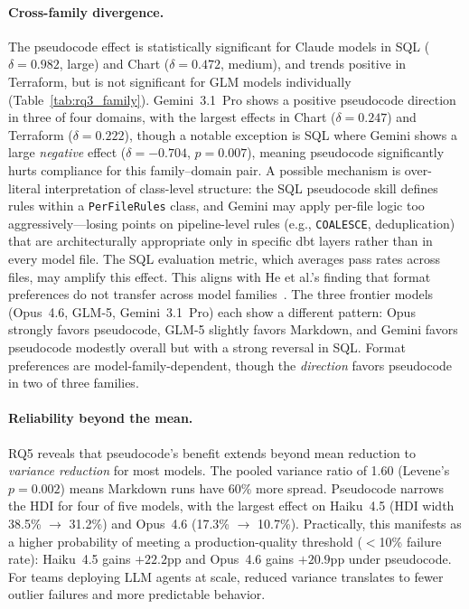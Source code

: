 \documentclass[sigconf,nonacm]{acmart}
\begin{document}
\paragraph{Cross-family divergence.}
The pseudocode effect is statistically significant for Claude models in SQL
($\delta = 0.982$, large) and Chart ($\delta = 0.472$, medium), and trends
positive in Terraform, but is
not significant for GLM models individually (Table~\ref{tab:rq3_family}).
Gemini~3.1~Pro shows a positive pseudocode direction in three of four domains,
with the largest effects in Chart ($\delta = 0.247$) and
Terraform ($\delta = 0.222$), though a notable exception is SQL where
Gemini shows a large \emph{negative} effect ($\delta = -0.704$, $p = 0.007$),
meaning pseudocode significantly hurts compliance for this family--domain pair.
A possible mechanism is over-literal interpretation of class-level structure:
the SQL pseudocode skill defines rules within a \texttt{PerFileRules} class,
and Gemini may apply per-file logic too aggressively---losing points on
pipeline-level rules (e.g., \texttt{COALESCE}, deduplication) that are
architecturally appropriate only in specific dbt layers rather than in every
model file. The SQL evaluation metric, which averages pass rates across files,
may amplify this effect.
This aligns with He et al.'s finding that format
preferences do not transfer across model families~\cite{he2024prompt}.
The three frontier models (Opus~4.6, GLM-5, Gemini~3.1~Pro) each show a
different pattern: Opus strongly favors pseudocode, GLM-5 slightly favors
Markdown, and Gemini favors pseudocode modestly overall but with a strong
reversal in SQL. Format preferences
are model-family-dependent, though the \emph{direction} favors pseudocode
in two of three families.

\paragraph{Reliability beyond the mean.}
RQ5 reveals that pseudocode's benefit extends beyond mean reduction to
\emph{variance reduction} for most models. The pooled variance ratio of
1.60 (Levene's $p = 0.002$) means Markdown runs have 60\% more spread.
Pseudocode narrows the HDI for four of five models, with the largest effect
on Haiku~4.5 (HDI width 38.5\% $\to$ 31.2\%) and Opus~4.6
(17.3\% $\to$ 10.7\%).
Practically, this manifests as a higher probability of meeting a
production-quality threshold ($<$10\% failure rate): Haiku~4.5 gains
$+22.2$pp and Opus~4.6 gains $+20.9$pp under pseudocode.
For teams deploying LLM agents at scale, reduced variance translates to
fewer outlier failures and more predictable behavior.
\end{document}

